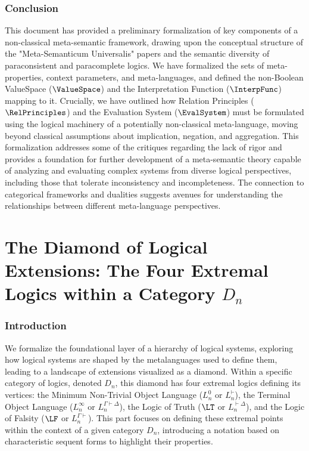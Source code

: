																	\section{Conclusion}
																	
																	\RaggedRight %
																	This document has provided a preliminary formalization of key components of a non-classical meta-semantic framework, drawing upon the conceptual structure of the "Meta-Semanticum Universalis" papers and the semantic diversity of paraconsistent and paracomplete logics. We have formalized the sets of meta-properties, context parameters, and meta-languages, and defined the non-Boolean ValueSpace ($\ValueSpace$) and the Interpretation Function ($\InterpFunc$) mapping to it. Crucially, we have outlined how Relation Principles ($\RelPrinciples$) and the Evaluation System ($\EvalSystem$) must be formulated using the logical machinery of a potentially non-classical meta-language, moving beyond classical assumptions about implication, negation, and aggregation. This formalization addresses some of the critiques regarding the lack of rigor and provides a foundation for further development of a meta-semantic theory capable of analyzing and evaluating complex systems from diverse logical perspectives, including those that tolerate inconsistency and incompleteness. The connection to categorical frameworks and dualities suggests avenues for understanding the relationships between different meta-language perspectives.
																	
																	\part{The Diamond of Logical Extensions: The Four Extremal Logics within a Category $D_n$} %
																	
																	\section{Introduction}
																	
																	We formalize the foundational layer of a hierarchy of logical systems, exploring how logical systems are shaped by the metalanguages used to define them, leading to a landscape of extensions visualized as a diamond. Within a specific category of logics, denoted $D_n$, this diamond has four extremal logics defining its vertices: the Minimum Non-Trivial Object Language ($L^0_n$ or $L^{\vdash}_n$), the Terminal Object Language ($L^\infty_n$ or $L^{\Gamma\vdash\Delta}_n$), the Logic of Truth ($\LT$ or $L^{\vdash\Delta}_n$), and the Logic of Falsity ($\LF$ or $L^{\Gamma\vdash}_n$). This part focuses on defining these extremal points within the context of a given category $D_n$, introducing a notation based on characteristic sequent forms to highlight their properties.
																	
